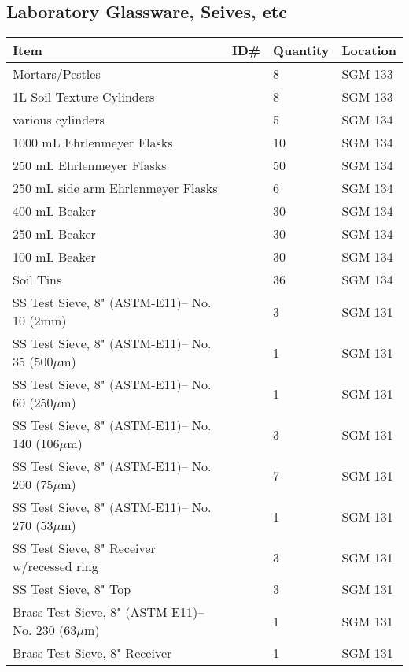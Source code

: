 \documentclass[12pt]{../SOP4_alpha}\usepackage[]{graphicx}\usepackage[]{color}
\begin{document}
\subsection{Laboratory Glassware, Seives, etc}

\begin{tabular}{|l|l|l|l|}
\hline
Item      & ID\#  & Quantity & Location \\ \hline
Mortars/Pestles             && 8 & SGM 133\\
1L Soil Texture Cylinders   && 8 & SGM 133 \\
various cylinders           && 5 & SGM 134\\
1000 mL Ehrlenmeyer Flasks && 10 & SGM 134 \\
250 mL Ehrlenmeyer Flasks && 50 & SGM 134 \\
250 mL side arm  Ehrlenmeyer Flasks && 6 & SGM 134 \\
400 mL Beaker          &&  30  & SGM 134 \\
250 mL Beaker          &&  30  & SGM 134 \\
100 mL Beaker          &&  30  & SGM 134 \\
Soil Tins                   && 36 & SGM 134\\
SS Test Sieve, 8" (ASTM-E11)-- No. 10 (2mm) && 3  & SGM 131 \\
SS Test Sieve, 8" (ASTM-E11)-- No. 35 (500$\mu$m) && 1  & SGM 131 \\
SS Test Sieve, 8" (ASTM-E11)-- No. 60 (250$\mu$m) && 1  & SGM 131 \\
SS Test Sieve, 8" (ASTM-E11)-- No. 140 (106$\mu$m) && 3  & SGM 131 \\
SS Test Sieve, 8" (ASTM-E11)-- No. 200 (75$\mu$m) && 7  & SGM 131 \\
SS Test Sieve, 8" (ASTM-E11)-- No. 270 (53$\mu$m) && 1  & SGM 131 \\
SS Test Sieve, 8" Receiver w/recessed ring && 3  & SGM 131 \\
SS Test Sieve, 8" Top                  && 3  & SGM 131 \\

Brass Test Sieve, 8" (ASTM-E11)-- No. 230 (63$\mu$m) && 1  & SGM 131 \\
Brass Test Sieve, 8" Receiver && 1  & SGM 131 \\


\end{tabular}
\end{document}
